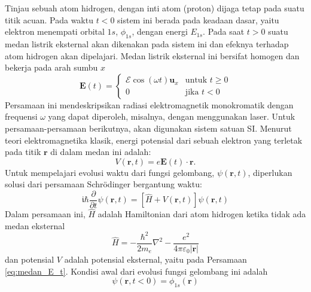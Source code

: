 \documentclass[a4paper,bahasa]{paper}
\renewcommand{\imath}{\mathfrak{i}}
\begin{document}
Tinjau sebuah atom hidrogen, dengan inti atom (proton) dijaga tetap pada suatu titik
acuan. Pada waktu $t < 0$ sistem ini berada pada keadaan dasar, yaitu elektron
menempati orbital $1s$, $\phi_{1s}$, dengan energi $E_{1s}$. Pada saat $t > 0$
suatu medan listrik eksternal akan dikenakan pada sistem ini dan efeknya
terhadap atom hidrogen akan dipelajari.
Medan listrik eksternal ini bersifat homogen dan bekerja pada arah sumbu $x$
%
\begin{equation}
\mathbf{E}(t) =
\begin{cases} 
\mathcal{E} \cos(\omega t) \mathbf{u}_{x} & \mbox{untuk } t \geq 0\\
0 & \mbox{jika } t < 0
\end{cases}
\label{eq:medan_E_t}
\end{equation}
%
Persamaan ini mendeskripsikan radiasi elektromagnetik monokromatik
dengan frequensi $\omega$ yang dapat diperoleh, misalnya, dengan menggunakan
laser. Untuk persamaan-persamaan berikutnya, akan digunakan sistem satuan SI.
Menurut teori elektromagnetika klasik, energi potensial dari sebuah elektron
yang terletak pada titik $\mathbf{r}$ di dalam medan ini adalah:
\begin{equation}
V(\mathbf{r},t) = e \mathbf{E}(t) \cdot \mathbf{r}.
\end{equation}
Untuk mempelajari evolusi waktu dari fungsi gelombang, $\psi(\mathbf{r},t)$,
diperlukan solusi dari persamaan Schr\"{o}dinger bergantung waktu:
%
\begin{equation}
\imath \hbar \frac{\partial}{\partial t} \psi(\mathbf{r},t) =
\left[ \hat{H} + V(\mathbf{r},t) \right] \psi(\mathbf{r},t)
\label{eq:td_sch}
\end{equation}
%
Dalam persamaan ini, $\hat{H}$ adalah Hamiltonian dari atom hidrogen
ketika tidak ada medan eksternal
%
\begin{equation}
\hat{H} = -\frac{\hbar^2}{2m_{e}}\nabla^2 -
\frac{e^2}{4\pi\varepsilon_{0}\left|\mathbf{r}\right|}
\end{equation}
%
dan potensial $V$ adalah potensial eksternal, yaitu pada Persamaan \eqref{eq:medan_E_t}.
Kondisi awal dari evolusi fungsi gelombang ini adalah
\begin{equation}
\psi(\mathbf{r}, t < 0) = \phi_{1s}(\mathbf{r})
\end{equation}
\end{document}

